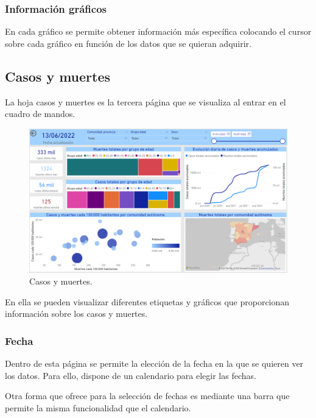 \subsubsection{Información gráficos}
En cada gráfico se permite obtener información más específica colocando el cursor sobre cada gráfico en función de los datos que se quieran adquirir.

\subsection{Casos y muertes}
La hoja casos y muertes es la tercera página que se visualiza al entrar en el cuadro de mandos.

\begin{figure}[h]
    \advance\leftskip-0.5cm 
    \includegraphics[scale=0.55]{img/powerBI_casosYmuertes.PNG}
    \caption{Casos y muertes.}
\end{figure}

En ella se pueden visualizar diferentes etiquetas y gráficos que proporcionan información sobre los casos y muertes.

\subsubsection{Fecha}
Dentro de esta página se permite la elección de la fecha en la que se quieren ver los datos.
Para ello, dispone de un calendario para elegir las fechas.

Otra forma que ofrece para la selección de fechas es mediante una barra que permite la misma funcionalidad que el calendario.

